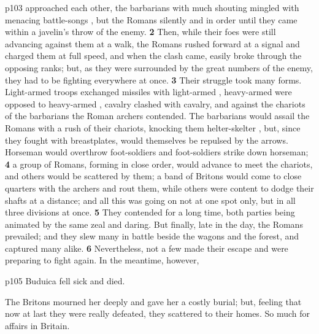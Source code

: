 p103 approached each other, the barbarians with much shouting mingled with mena­cing battle-songs , but the Romans silently and in order until they came within a javelin's throw of the enemy. \textbf{2} Then, while their foes were still advancing against them at a walk, the Romans rushed forward at a signal and charged them at full speed, and when the clash came, easily broke through the opposing ranks; but, as they were surrounded by the great numbers of the enemy, they had to be fighting everywhere at once. \textbf{3} Their struggle took many forms. Light-armed troops exchanged missiles with light-armed , heavy-armed were opposed to heavy-armed , cavalry clashed with cavalry, and against the chariots of the barbarians the Roman archers contended. The barbarians would assail the Romans with a rush of their chariots, knocking them helter-skelter , but, since they fought with breastplates, would themselves be repulsed by the arrows. Horseman would overthrow foot-soldiers and foot-soldiers strike down horseman; \textbf{4} a group of Romans, forming in close order, would advance to meet the chariots, and others would be scattered by them; a band of Britons would come to close quarters with the archers and rout them, while others were content to dodge their shafts at a distance; and all this was going on not at one spot only, but in all three divisions at once. \textbf{5} They contended for a long time, both parties being animated by the same zeal and daring. But finally, late in the day, the Romans prevailed; and they slew many in battle beside the wagons and the forest, and captured many alike. \textbf{6} Nevertheless, not a few made their escape and were preparing to fight again. In the meantime, however,

p105 Buduica fell sick and died.

The Britons mourned her deeply and gave her a costly burial; but, feeling that now at last they were really defeated, they scattered to their homes. So much for affairs in Britain.

